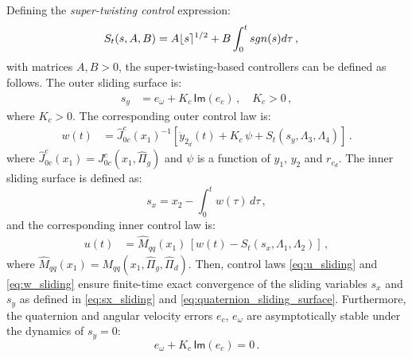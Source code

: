 \begin{theorem}
Defining the {\it super-twisting control} expression:
%
\begin{align}
S_t(s,A,B) &= A \lfloor s \rceil^{1/2} + B \int^{t}_{0}{sgn(s) d\tau} \,, \nonumber
\end{align}
%
with matrices $A, B > 0$, the super-twisting-based controllers can be defined as follows.
%
The outer sliding surface is:
%
\begin{align}
s_{y} &= e_{\omega} + K_{c} \, \mathsf{Im}(e_{c}) \,, \quad K_{c} > 0 \,,
\label{eq:quaternion_sliding_surface}
\end{align}
%
where $K_c > 0$. The corresponding outer control law is:
%
\begin{align}
w(t) &= \widehat{J}^{c}_{0c}(x_1)^{-1} \left[\dot{y}_{2_d}(t) \!+\! K_{c} \, \psi \!+\! S_t(s_y,\Lambda_3,\Lambda_4)\right] \,.
\label{eq:w_sliding}
\end{align}
%
where $\widehat{J}^{c}_{0c}(x_1) = J^{c}_{0c}(x_1,\widehat{\Pi}_g)$ and $\psi$ is a function of $y_1$, $y_2$ and $r_{c_d}$. 
%
The inner sliding surface is defined as:
%
\begin{equation}
s_x = x_2 - \int^t_0{w(\tau)} \, d\tau\,,
\label{eq:sx_sliding}
\end{equation}
%
and the corresponding inner control law is:
%
\begin{align}
u(t) &= \widehat{M}_{qq}(x_1) \, \left[ w(t) - S_t(s_x,\Lambda_1,\Lambda_2) \right] \,,
\label{eq:u_sliding}
\end{align}
%
where $\widehat{M}_{qq}(x_1) = M_{qq}(x_1,\widehat{\Pi}_g,\widehat{\Pi}_d)$.
%
Then, control laws \eqref{eq:u_sliding} and \eqref{eq:w_sliding} ensure finite-time exact convergence 
of the sliding variables $s_x$ and $s_y$ as defined in \eqref{eq:sx_sliding} and 
\eqref{eq:quaternion_sliding_surface}. Furthermore, the quaternion and angular velocity errors 		$e_c$, 
$e_\omega$ are asymptotically stable under the dynamics of $s_y = 0$: 
%
\begin{equation}
e_{\omega} + K_{c} \, \mathsf{Im}(e_{c}) = 0 \,.
\label{eq:quaternion_sliding_condition}
\end{equation}

\end{theorem}

